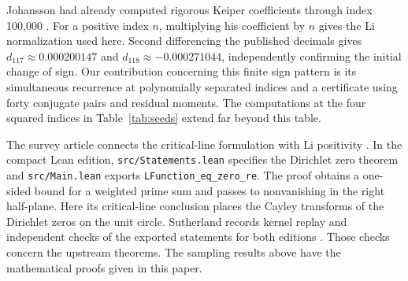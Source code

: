 Johansson had already computed rigorous Keiper coefficients through index
100,000 \cite{joh}. For a positive index $n$, multiplying his coefficient by $n$
gives the Li normalization used here. Second differencing the published
decimals gives $d_{117}\approx0.000200147$ and
$d_{118}\approx-0.000271044$, independently confirming the initial
change of sign. Our contribution concerning this finite sign pattern is its
simultaneous recurrence at polynomially separated indices and a certificate
using forty conjugate pairs and residual moments. The computations at the
four squared indices in Table~\ref{tab:seeds} extend far beyond this table.

The survey article connects the critical-line formulation with Li
positivity \cite{wiki}. In the compact Lean edition, \texttt{src/Statements.lean}
specifies the Dirichlet zero theorem and \texttt{src/Main.lean} exports
\texttt{LFunction\_eq\_zero\_re}. The proof obtains a one-sided bound for a
weighted prime sum and passes to nonvanishing in the right half-plane.
Here its critical-line conclusion places the Cayley transforms of the
Dirichlet zeros on the unit circle. Sutherland records kernel replay and
independent checks of the exported statements for both editions \cite{lean}.
Those checks concern the upstream theorems. The sampling results above have
the mathematical proofs given in this paper.

